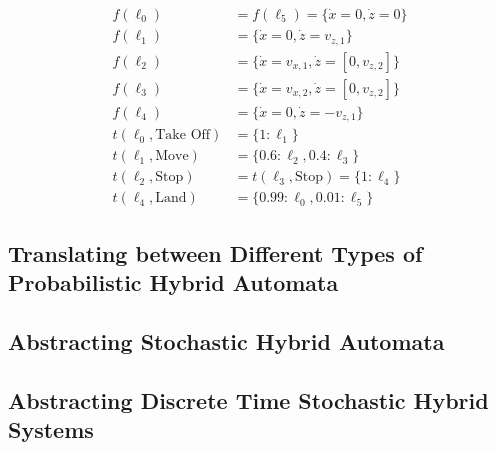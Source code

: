 \begin{ex}
\begin{align*}
    f(\ell_{0}) & = f(\ell_{5}) = \{\dot{x} = 0,\dot{z} = 0 \} \\
    f(\ell_{1}) & = \{\dot{x} = 0,\dot{z} = v_{z,1}\} \\
    f(\ell_{2}) & = \{\dot{x} = v_{x,1},\dot{z} = [0,v_{z,2}]\} \\
    f(\ell_{3}) & = \{\dot{x} = v_{x,2},\dot{z} = [0,v_{z,2}]\} \\
    f(\ell_{4}) & = \{\dot{x} = 0,\dot{z}=-v_{z,1}\} \\
    t(\ell_{0},\text{Take Off}) & = \{1: \ell_{1}\} \\
    t(\ell_{1},\text{Move}) & = \{0.6: \ell_{2}, 0.4: \ell_{3}\} \\
    t(\ell_{2},\text{Stop}) & = t(\ell_{3},\text{Stop}) = \{1: \ell_{4}\} \\
    t(\ell_{4},\text{Land}) & = \{0.99: \ell_{0}, 0.01:\ell_{5}\}
\end{align*}
\end{ex}



\subsection{Translating between Different Types of Probabilistic Hybrid Automata}


\subsection{Abstracting Stochastic Hybrid Automata}


\subsection{Abstracting Discrete Time Stochastic Hybrid Systems}





